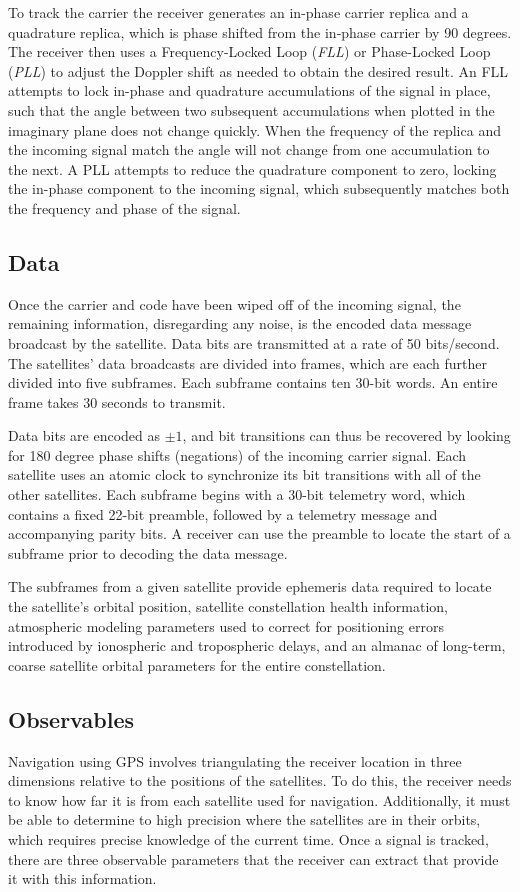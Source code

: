 \documentclass[12pt]{article}
\begin{document}
To track the carrier the receiver generates an in-phase carrier replica and a quadrature replica, which is phase shifted from the in-phase carrier by 90 degrees. The receiver then uses a Frequency-Locked Loop (\emph{FLL}) or Phase-Locked Loop (\emph{PLL}) to adjust the Doppler shift as needed to obtain the desired result. An FLL attempts to lock in-phase and quadrature accumulations of the signal in place, such that the angle between two subsequent accumulations when plotted in the imaginary plane does not change quickly. When the frequency of the replica and the incoming signal match the angle will not change from one accumulation to the next. A PLL attempts to reduce the quadrature component to zero, locking the in-phase component to the incoming signal, which subsequently matches both the frequency and phase of the signal.

\subsection{Data}
\label{sec:data}
Once the carrier and code have been wiped off of the incoming signal, the remaining information, disregarding any noise, is the encoded data message broadcast by the satellite. Data bits are transmitted at a rate of 50 bits/second. The satellites' data broadcasts are divided into frames, which are each further divided into five subframes. Each subframe contains ten 30-bit words. An entire frame takes 30 seconds to transmit.

Data bits are encoded as $\pm 1$, and bit transitions can thus be recovered by looking for 180 degree phase shifts (negations) of the incoming carrier signal. Each satellite uses an atomic clock to synchronize its bit transitions with all of the other satellites. Each subframe begins with a 30-bit telemetry word, which contains a fixed 22-bit preamble, followed by a telemetry message and accompanying parity bits. A receiver can use the preamble to locate the start of a subframe prior to decoding the data message.

The subframes from a given satellite provide ephemeris data required to locate the satellite's orbital position, satellite constellation health information, atmospheric modeling parameters used to correct for positioning errors introduced by ionospheric and tropospheric delays, and an almanac of long-term, coarse satellite orbital parameters for the entire constellation.

\subsection{Observables}
\label{sec:observables}
Navigation using GPS involves triangulating the receiver location in three dimensions relative to the positions of the satellites. To do this, the receiver needs to know how far it is from each satellite used for navigation. Additionally, it must be able to determine to high precision where the satellites are in their orbits, which requires precise knowledge of the current time. Once a signal is tracked, there are three observable parameters that the receiver can extract that provide it with this information.
\end{document}
